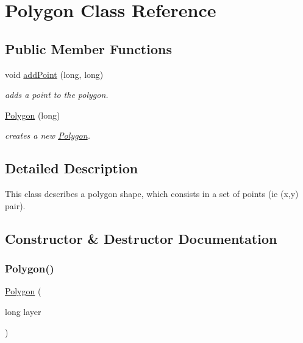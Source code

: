 \hypertarget{class_c_i_f_1_1_polygon}{}\section{Polygon Class Reference}
\label{class_c_i_f_1_1_polygon}
\subsection*{Public Member Functions}
\begin{DoxyCompactItemize}
\item 
void \mbox{\hyperlink{class_c_i_f_1_1_polygon_ab3047469780327f18539907e1303ea15}{add\+Point}} (long, long)
\begin{DoxyCompactList}\small\item\em adds a point to the polygon. \end{DoxyCompactList}\item 
\mbox{\hyperlink{class_c_i_f_1_1_polygon_a07683a8a7dea6f09aba6997cc99fff5a}{Polygon}} (long)
\begin{DoxyCompactList}\small\item\em creates a new \mbox{\hyperlink{class_c_i_f_1_1_polygon}{Polygon}}. \end{DoxyCompactList}\end{DoxyCompactItemize}


\subsection{Detailed Description}
This class describes a polygon shape, which consists in a set of points (ie (x,y) pair). 

\subsection{Constructor \& Destructor Documentation}
\mbox{\label{class_c_i_f_1_1_polygon_a07683a8a7dea6f09aba6997cc99fff5a}} 
\subsubsection{\texorpdfstring{Polygon()}{Polygon()}}
{\footnotesize\ttfamily \mbox{\hyperlink{class_c_i_f_1_1_polygon}{Polygon}} (\begin{DoxyParamCaption}\item[{long}]{layer }\end{DoxyParamCaption})}



